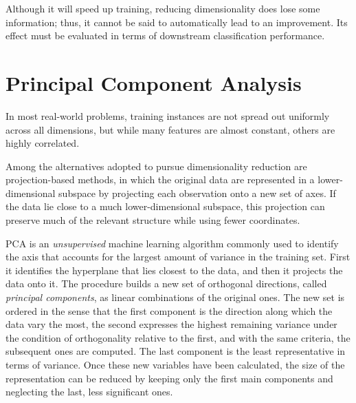 Although it will speed up training, reducing dimensionality does lose some information; thus, it cannot be said to automatically lead to an improvement. Its effect must be evaluated in terms of downstream classification performance.


\section{Principal Component Analysis}
\label{sec:pca_theory}

In most real-world problems, training instances are not spread out uniformly across
all dimensions, but while many features are almost constant, others are highly correlated.

Among the alternatives adopted to pursue dimensionality reduction are projection-based methods, in which the original data are represented in a lower-dimensional subspace by projecting each observation onto a new set of axes. If the data lie close to a much lower-dimensional subspace, this projection can preserve much of the relevant structure while using fewer coordinates. 

PCA is an \textit{unsupervised} machine learning algorithm commonly used to identify the axis that accounts for the largest amount of variance in the training set. First it identifies the hyperplane that lies closest to the data, and then
it projects the data onto it. 
The procedure builds a new set of orthogonal directions, called \textit{principal components}, as linear combinations of the original ones. The new set is ordered in the sense that the first component is the direction along which the data vary the most, the second expresses the highest  remaining variance under the condition of orthogonality relative to the first, and with the same criteria, the subsequent ones are computed. The last component is the least representative in terms of variance. Once these new variables have been calculated, the size of the representation can be reduced by keeping only the first main components and neglecting the last, less significant ones.


